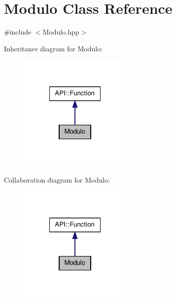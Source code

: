 \hypertarget{class_modulo}{\section{Modulo Class Reference}
\label{class_modulo}
}


{\ttfamily \#include $<$Modulo.\-hpp$>$}



Inheritance diagram for Modulo\-:\nopagebreak
\begin{figure}[H]
\begin{center}
\leavevmode
\includegraphics[width=156pt]{class_modulo__inherit__graph}
\end{center}
\end{figure}


Collaboration diagram for Modulo\-:\nopagebreak
\begin{figure}[H]
\begin{center}
\leavevmode
\includegraphics[width=156pt]{class_modulo__coll__graph}
\end{center}
\end{figure}
